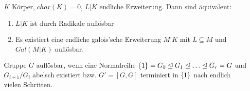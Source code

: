 \documentclass[../main.tex]{subfiles}
\begin{document}
\begin{theorem}\label{theo:3.25}
    $K$ Körper, $char(K)=0$, $L|K$ endliche Erweiterung. Dann sind äquivalent:
    \begin{enumerate}[label=(\roman*)]
        \item $L|K$ ist durch Radikale auflösbar
        \item Es existiert eine endliche galois'sche Erweiterung $M|K$ mit $L\subseteq M$ und $Gal(M|K)$ auflösbar.
    \end{enumerate}
\end{theorem}
\begin{reminder*}
    Gruppe $G$ auflösbar, wenn eine Normalreihe $\trivGO=G_0\nteq G_1 \nteq\dots\nteq G_r = G$ und $G_{i+1}/G_i$ abelsch existiert bzw. $G' = [G,G]$ terminiert in $\{1\}$ nach endlich vielen Schritten.
\end{reminder*}
\end{document}
